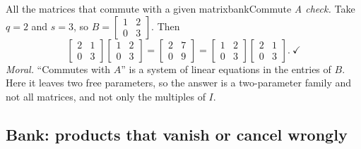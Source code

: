\documentclass[11pt]{article}
\begin{document}
\begin{exmp}{All the matrices that commute with a given matrix}{bankCommute}
\emph{A check.} Take $q=2$ and $s=3$, so $B=\begin{bmatrix}1&2\\0&3\end{bmatrix}$. Then
\[
\begin{bmatrix}2&1\\0&3\end{bmatrix}\begin{bmatrix}1&2\\0&3\end{bmatrix}=\begin{bmatrix}2&7\\0&9\end{bmatrix}=\begin{bmatrix}1&2\\0&3\end{bmatrix}\begin{bmatrix}2&1\\0&3\end{bmatrix}.\ \checkmark
\]
\emph{Moral.} ``Commutes with $A$'' is a system of linear equations in the entries of $B$. Here it leaves two free parameters, so the answer is a two-parameter family and not all matrices, and not only the multiples of $I$.
\end{exmp}

\subsection*{Bank: products that vanish or cancel wrongly}
\end{document}
